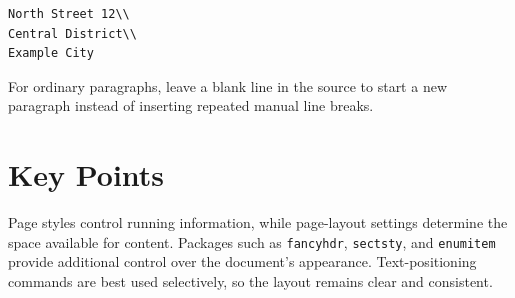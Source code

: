 \documentclass[12pt,a4paper]{article}
\begin{document}
\begin{verbatim}
North Street 12\\
Central District\\
Example City
\end{verbatim}

For ordinary paragraphs, leave a blank line in the source to start a new
paragraph instead of inserting repeated manual line breaks.

\section{Key Points}

Page styles control running information, while page-layout settings determine
the space available for content. Packages such as \texttt{fancyhdr},
\texttt{sectsty}, and \texttt{enumitem} provide additional control over the
document's appearance. Text-positioning commands are best used selectively,
so the layout remains clear and consistent.
\end{document}
